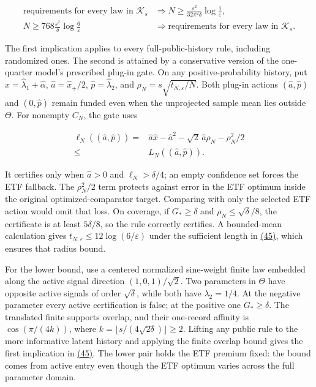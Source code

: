 \documentclass[11pt]{article}
\begin{document}
\begin{equation*}
\begin{aligned}
\text{requirements for every law in }\mathcal K_s
&\Longrightarrow
N\geq\frac{s^2}{32\pi^2\delta}
          \log\frac1\varepsilon,\\
N\geq768\frac{s^2}{\delta}\log\frac6\varepsilon
&\Longrightarrow
\text{requirements for every law in }\mathcal K_s.
\end{aligned}\tag{45}\label{eq:45}
\end{equation*}

The first implication applies to every full-public-history
rule, including randomized ones. The second is attained by a
conservative version of the one-quarter model's prescribed
plug-in gate. On any
positive-probability history, put
\(\widehat x=\widehat\lambda_1+\widehat\alpha\),
\(\widehat a=\widehat x_+/2\),
\(\widehat p=\widehat\lambda_2\), and
\(\rho_N=s\sqrt{t_{N,\varepsilon}/N}\). Both plug-in
actions \((\widehat a,\widehat p)\) and
\((0,\widehat p)\) remain funded even when the unprojected
sample mean lies outside \(\Theta\). For nonempty \(C_N\),
the gate uses

\begin{equation*}
\begin{aligned}
\ell_N((\widehat a,\widehat p))
={}&\widehat a\widehat x-\widehat a^2
 -\sqrt2\,\widehat a\rho_N-\rho_N^2/2\\
\leq{}&L_N((\widehat a,\widehat p)).
\end{aligned}\tag{46}\label{eq:46}
\end{equation*}

It certifies only when \(\widehat a>0\) and
\(\ell_N>\delta/4\); an empty confidence set forces the
ETF fallback. The \(\rho_N^2/2\) term protects against
error in the ETF optimum inside the original
optimized-comparator target. Comparing with only the
selected ETF action would omit that loss. On coverage, if
\(G_*\geq\delta\) and \(\rho_N\leq\sqrt\delta/8\),
the certificate is at least \(5\delta/8\), so the rule
correctly certifies. A bounded-mean calculation gives
\(t_{N,\varepsilon}\leq12\log(6/\varepsilon)\) under the
sufficient length in \hyperref[eq:45]{(45)}, which ensures that radius bound.

For the lower bound, use a centered normalized sine-weight
finite law embedded along the active signal direction
\((1,0,1)/\sqrt2\). Two parameters in \(\Theta\) have
opposite active signals of order \(\sqrt\delta\), while
both have \(\lambda_2=1/4\). At the negative parameter
every active certification is false; at the positive one
\(G_*\geq\delta\). The translated finite supports overlap,
and their one-record affinity is
\(\cos(\pi/(4k))\), where
\(k=\lfloor s/(4\sqrt{2\delta})\rfloor\geq2\).
Lifting any public rule to the more informative latent
history and applying the finite overlap bound gives the
first implication in \hyperref[eq:45]{(45)}. The lower pair holds the ETF
premium fixed: the bound comes from active entry even though
the ETF optimum varies across the full parameter domain.
\end{document}
